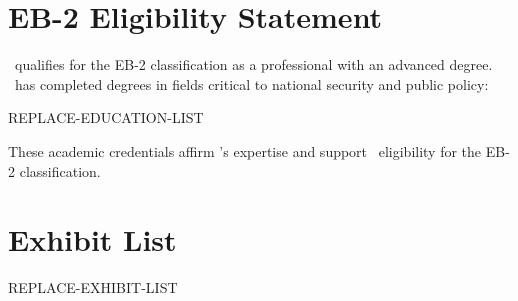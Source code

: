 \documentclass{pl_template}  %
\begin{document}

\newpage  %
\otherpagesheader  %
\tableofcontents
\section{EB-2 Eligibility Statement}
\Petitioner \  qualifies for the EB-2 classification as a professional with an advanced degree. \HeSheUp \ has completed degrees in fields critical to national security and public policy: 
\begin{itemize}
REPLACE-EDUCATION-LIST
\end{itemize}
These academic credentials affirm \Petitioner’s expertise and support \HisHerLow \ eligibility for the EB-2 classification.




\vspace{2em}

\section*{Exhibit List}
\begin{itemize}
REPLACE-EXHIBIT-LIST
\end{itemize}
 
\end{document}
